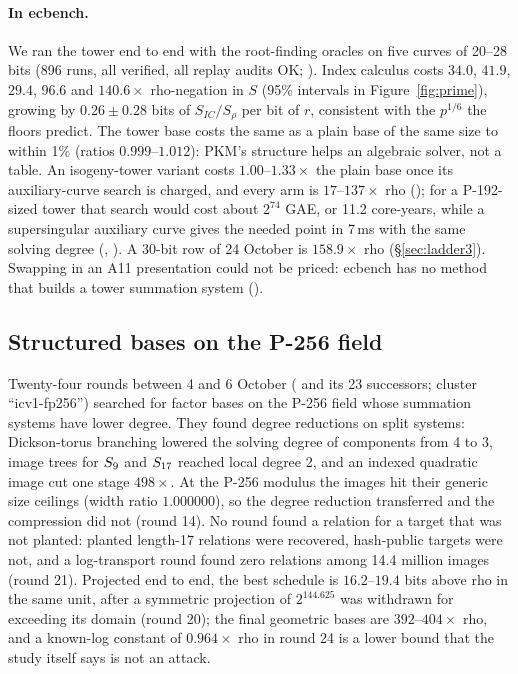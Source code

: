 \paragraph{In ecbench.} We ran the tower end to end with the root-finding
oracles on five curves of 20--28 bits (896 runs, all verified, all replay
audits OK; ). Index calculus
costs $34.0$, $41.9$, $29.4$, $96.6$ and $140.6\times$ rho-negation in $S$
(95\% intervals in Figure~\ref{fig:prime}), growing by $0.26\pm0.28$ bits of
$S_{IC}/S_\rho$ per bit of $r$, consistent with the $p^{1/6}$ the floors
predict. The tower base costs the same as a plain base of the same size to
within 1\% (ratios $0.999$--$1.012$): PKM's structure helps an algebraic
solver, not a table. An isogeny-tower variant costs $1.00$--$1.33\times$ the
plain base once its auxiliary-curve search is charged, and every arm is
$17$--$137\times$ rho ();
for a P-192-sized tower that search would cost about $2^{74}$ GAE, or
11.2 core-years, while a supersingular auxiliary curve gives the needed point
in 7\,ms with the same solving degree
(,
). A 30-bit row of 24 October
is $158.9\times$ rho (\S\ref{sec:ladder3}). Swapping in an A11 presentation
could not be priced: ecbench has no method that builds a tower summation
system ().

\subsection{Structured bases on the P-256 field}

Twenty-four rounds between 4 and 6 October
(
and its 23 successors; cluster ``icv1-fp256'') searched for factor bases on
the P-256 field whose summation systems have lower degree. They found
degree reductions on split systems: Dickson-torus branching lowered the
solving degree of components from 4 to 3, image trees for $S_{9}$ and
$S_{17}$ reached local degree 2, and an indexed quadratic image cut one
stage $498\times$. At the P-256 modulus the images hit their generic size
ceilings (width ratio $1.000000$), so the degree reduction transferred and
the compression did not (round 14). No round found a relation for a
target that was not planted: planted length-17 relations were recovered,
hash-public targets were not, and a log-transport round found zero
relations among 14.4 million images (round 21). Projected end to end, the
best schedule is $16.2$--$19.4$ bits above rho in the same unit, after a
symmetric projection of $2^{144.625}$ was withdrawn for exceeding its domain
(round 20); the final geometric bases are $392$--$404\times$ rho, and a
known-log constant of $0.964\times$ rho in round 24 is a lower bound that the
study itself says is not an attack.

